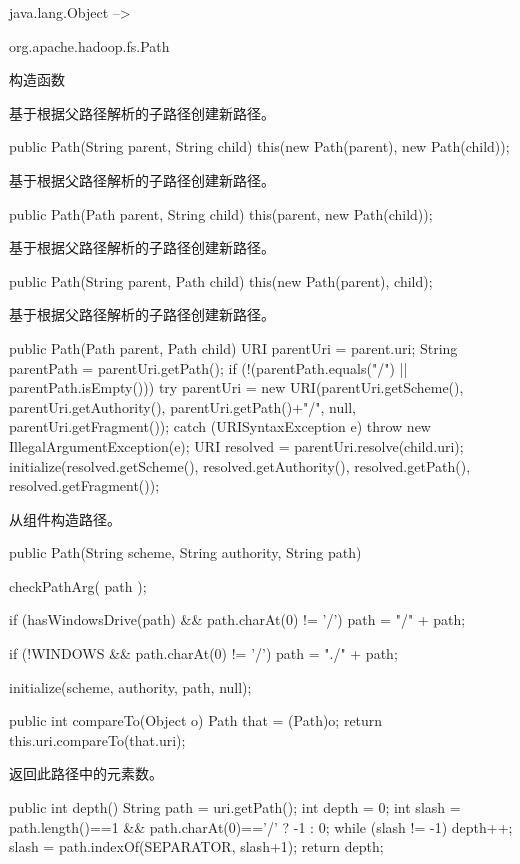 java.lang.Object -->

org.apache.hadoop.fs.Path


构造函数

基于根据父路径解析的子路径创建新路径。
\begin{java}
public Path(String parent, String child) {
	this(new Path(parent), new Path(child));
}
\end{java}
基于根据父路径解析的子路径创建新路径。
\begin{java}
public Path(Path parent, String child) {
	this(parent, new Path(child));
}
\end{java}
基于根据父路径解析的子路径创建新路径。
\begin{java}
public Path(String parent, Path child) {
	this(new Path(parent), child);
}
\end{java}
基于根据父路径解析的子路径创建新路径。
\begin{java}
public Path(Path parent, Path child) {
	  URI parentUri = parent.uri;
	  String parentPath = parentUri.getPath();
	  if (!(parentPath.equals("/") || parentPath.isEmpty())) {
	    try {
	      parentUri = new URI(parentUri.getScheme(), parentUri.getAuthority(),
	                    parentUri.getPath()+"/", null, parentUri.getFragment());
	    } catch (URISyntaxException e) {
	      throw new IllegalArgumentException(e);
	    }
	  }
	  URI resolved = parentUri.resolve(child.uri);
	  initialize(resolved.getScheme(), resolved.getAuthority(),
	             resolved.getPath(), resolved.getFragment());
	}
\end{java}
从组件构造路径。
\begin{java}
public Path(String scheme, String authority, String path) {
  checkPathArg( path );

  if (hasWindowsDrive(path) && path.charAt(0) != '/') {
    path = "/" + path;
  }

	if (!WINDOWS && path.charAt(0) != '/') {
    path = "./" + path;
  }

  initialize(scheme, authority, path, null);
}
\end{java}
\begin{java}
public int compareTo(Object o) {
  Path that = (Path)o;
  return this.uri.compareTo(that.uri);
}
\end{java}
返回此路径中的元素数。
\begin{java}
public int depth() {
  String path = uri.getPath();
  int depth = 0;
  int slash = path.length()==1 && path.charAt(0)=='/' ? -1 : 0;
  while (slash != -1) {
    depth++;
    slash = path.indexOf(SEPARATOR, slash+1);
	}
	return depth;
}
\end{java}
